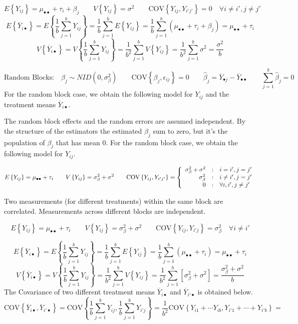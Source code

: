 \documentclass[
]{book}
\begin{document}
\[
E\left\{Y_{ij}\right\} =\mu_{\bullet\bullet} + \tau_i + \beta_j \qquad
V\left\{Y_{ij}\right\} = \sigma^2\qquad 
\mbox{COV}\left\{Y_{ij},Y_{i'j'}\right\}=0 \quad \forall i\ne i',j\ne j'
\] \[
E\left\{\overline{Y}_{i\bullet}\right\}=
E\left\{\frac{1}{b}\sum_{j=1}^bY_{ij}\right\}=
\frac{1}{b}\sum_{j=1}^b
E\left\{Y_{ij}\right\}=
\frac{1}{b}\sum_{j=1}^b\left(\mu_{\bullet\bullet} + \tau_i + \beta_j\right)=
\mu_{\bullet\bullet} + \tau_i
\] \[
V\left\{\overline{Y}_{i\bullet}\right\}=
V\left\{\frac{1}{b}\sum_{j=1}^bY_{ij}\right\}=
\frac{1}{b^2}\sum_{j=1}^b
V\left\{Y_{ij}\right\}=
\frac{1}{b^2}\sum_{j=1}^b\sigma^2=\frac{\sigma^2}{b}
\]

\[
\mbox{Random Blocks:} \quad
\beta_j \sim NID\left(0,\sigma_{\beta}^2\right)
\qquad  \mbox{COV}\left\{\beta_j,\epsilon_{ij}\right\}=0
\qquad \hat{\beta}_j = \overline{Y}_{\bullet j} - \overline{Y}_{\bullet\bullet}
\qquad  \sum_{j=1}^b\hat{\beta}_j=0
\] For the random block case, we obtain the following model for
\(Y_{ij}\) and the treatment means \(\overline{Y}_{i\bullet}\).

The random block effects and the random errors are assumed independent.
By the structure of the estimators the estimated \(\beta_j\) sum to
zero, but it's the population of \(\beta_j\) that has mean 0. For the
random block case, we obtain the following model for \(Y_{ij}\).

\[
E\left\{Y_{ij}\right\} =\mu_{\bullet\bullet} + \tau_i  \qquad
V\left\{Y_{ij}\right\} = \sigma_{\beta}^2 + \sigma^2 
\qquad 
\mbox{COV}\left\{Y_{ij},Y_{i'j'}\right\}=
\left\{ \begin{array}{r@{\quad:\quad}l}
    \sigma_{\beta}^2+\sigma^2 & i=i',j=j' \\
    \sigma_{\beta}^2 & i\ne i',j=j' \\
    0 & \forall i,i', j\ne j'
    \end{array} \right.
\]

Two measurements (for different treatments) within the same block are
correlated. Measurements across different blocks are independent.

\[
E\left\{Y_{ij}\right\} =\mu_{\bullet\bullet} + \tau_i  \qquad
V\left\{Y_{ij}\right\} = 
\sigma_{\beta}^2+\sigma^2\qquad 
\mbox{COV}\left\{Y_{ij},Y_{i'j}\right\}=\sigma_{\beta}^2 \quad \forall i\ne i'
\]

\[
E\left\{\overline{Y}_{i\bullet}\right\}=
E\left\{\frac{1}{b}\sum_{j=1}^bY_{ij}\right\}=
\frac{1}{b}\sum_{j=1}^b
E\left\{Y_{ij}\right\}=
\frac{1}{b}\sum_{j=1}^b\left(\mu_{\bullet\bullet} + \tau_i\right)=
\mu_{\bullet\bullet} + \tau_i
\] \[
V\left\{\overline{Y}_{i\bullet}\right\}=
V\left\{\frac{1}{b}\sum_{j=1}^bY_{ij}\right\}=
\frac{1}{b^2}\sum_{j=1}^b
V\left\{Y_{ij}\right\} =
\frac{1}{b^2}\sum_{j=1}^b\left[\sigma_{\beta}^2+\sigma^2\right]=\frac{\sigma_{\beta}^2+\sigma^2}{b}
\] The Covariance of two different treatment means
\(\overline{Y}_{i\bullet}\) and \(\overline{Y}_{i'\bullet}\) is obtained
below. \[
\mbox{COV}\left\{\overline{Y}_{i\bullet},\overline{Y}_{i'\bullet}\right\}=
\mbox{COV}\left\{\frac{1}{b}\sum_{j=1}^bY_{ij},\frac{1}{b}\sum_{j=1}^bY_{i'j}\right\}=
\frac{1}{b^2}\mbox{COV}\left\{Y_{i1}+\cdots Y_{ib},Y_{i'1}+\cdots +Y_{i'b}\right\}=
\]
\end{document}
